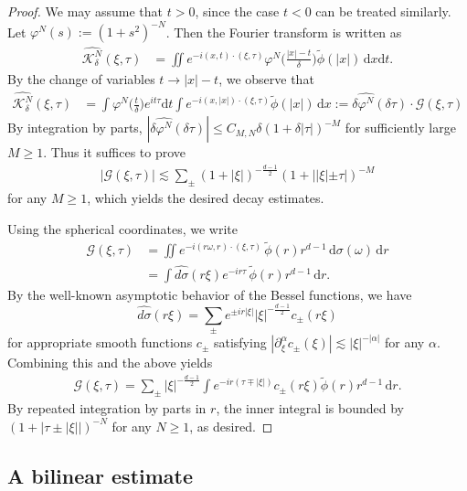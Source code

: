\documentclass[a4paper]{amsart}
\numberwithin{figure}{section}
\numberwithin{equation}{section}%
\theoremstyle{plain}%
\theoremstyle{definition}
\theoremstyle{remark}%
\def\d{\mathrm{d}}
\begin{document}
\begin{proof}
We may assume that $t>0$, since the case $t<0$ can be treated similarly.
Let $\varphi^{N}(s) := (1+s^2)^{-N}$. Then the Fourier transform is written as
\begin{align*}
\widehat{\mathcal K_\delta^N}(\xi,\tau)
&=\iint e^{-i(x,t)\cdot (\xi,\tau)} \varphi^{N}\Big(\frac{|x|-t}{\delta}\Big) \tilde \phi(|x|)\,\d x\d t.
\end{align*}
By the change of variables $t\rightarrow |x|-t$, we observe that
\begin{align*}
\widehat{\mathcal K_\delta^N}(\xi,\tau)&=
\int \varphi^{N}\Big(\frac t\delta\Big)e^{it\tau}\d t
\int e^{-i(x,|x|)\cdot(\xi,\tau)} \tilde \phi(|x|)\,\d x
:= \delta \widehat{\varphi^{N}}(\delta\tau) \cdot \mathcal G(\xi,\tau)
\end{align*}
By integration by parts,
$
|\delta \widehat{\varphi^{N}}(\delta\tau)|
\le C_{M,N} \delta (1+\delta|\tau|)^{-M}
$
for sufficiently large $M\ge1$.
Thus it suffices to prove
\begin{align}\label{decaying}
|\mathcal G(\xi,\tau)| \lesssim \sum_{\pm} (1+|\xi|)^{-\frac{d-1}2} (1+||\xi|\pm \tau|)^{-M}
\end{align}
for any $M\ge 1$, which yields the desired decay estimates.


Using the spherical coordinates, we write
\begin{align*}
\mathcal G(\xi,\tau)
&= \iint   e^{-i(r\omega, r)\cdot(\xi,\tau)}\,\tilde\phi(r)r^{d-1}\,\d\sigma(\omega)\, \d r
\\ 
& =   \int   \widehat{d\sigma}(r\xi) e^{-i r\tau}\,\tilde\phi(r)r^{d-1}\, \d r.
\end{align*}
By the well-known asymptotic behavior of the Bessel functions, we have 
\[\widehat{d\sigma}(r\xi)=\sum_\pm e^{\pm ir|\xi|} |\xi|^{-\frac{d-1}2}c_\pm(r\xi)\]
for appropriate smooth functions $c_{\pm}$ satisfying $|\partial_\xi^\alpha c_\pm(\xi)|\lesssim |\xi|^{-|\alpha|}$ for any $\alpha$.
Combining this and the above yields 
\begin{align*}
\mathcal G(\xi,\tau)=\sum_{\pm}  |\xi|^{-\frac{d-1}2} \int e^{-i r(\tau \mp |\xi|)}c_\pm(r\xi) \tilde\phi(r)r^{d-1}\,\d r. 
\end{align*}
By repeated integration by parts in $r$, the inner integral is bounded by $(1+|\tau\pm|\xi||)^{-N}$ for any $N\ge1$, as desired.
\end{proof}



\subsection*{A  bilinear estimate}
\end{document}
